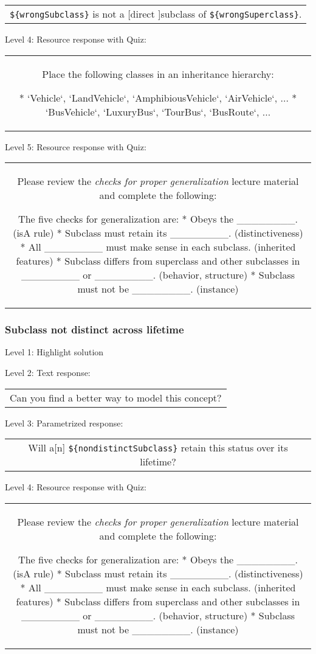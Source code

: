 \begin{tabular}{|c}
\verb|${wrongSubclass}| is not a [direct ]subclass of \verb|${wrongSuperclass}|.
\end{tabular} \medskip

\noindent Level 4: Resource response with Quiz:

\begin{tabular}{|c}
Place the following classes in an inheritance hierarchy:

* `Vehicle`, `LandVehicle`, `AmphibiousVehicle`, `AirVehicle`, ...
* `BusVehicle`, `LuxuryBus`, `TourBus`, `BusRoute`, ...
\end{tabular} \medskip

\noindent Level 5: Resource response with Quiz:

\begin{tabular}{|c}
Please review the \textit{checks for proper generalization} lecture material
and complete the following:

The five checks for generalization are:
* Obeys the ________. (isA rule)
* Subclass must retain its ________. (distinctiveness)
* All ________ must make sense in each subclass. (inherited features)
* Subclass differs from superclass and other subclasses in ________ or ________. 
(behavior, structure)
* Subclass must not be ________. (instance)
\end{tabular} \medskip


\subsubsection{Subclass not distinct across lifetime}

\noindent Level 1: Highlight solution \medskip

\noindent Level 2: Text response: \medskip

\begin{tabular}{|c}
Can you find a better way to model this concept?
\end{tabular} \medskip

\noindent Level 3: Parametrized response: \medskip

\begin{tabular}{|c}
Will a[n] \verb|${nondistinctSubclass}| retain this status over its lifetime?
\end{tabular} \medskip

\noindent Level 4: Resource response with Quiz:

\begin{tabular}{|c}
Please review the \textit{checks for proper generalization} lecture material
and complete the following:

The five checks for generalization are:
* Obeys the ________. (isA rule)
* Subclass must retain its ________. (distinctiveness)
* All ________ must make sense in each subclass. (inherited features)
* Subclass differs from superclass and other subclasses in ________ or ________. 
(behavior, structure)
* Subclass must not be ________. (instance)
\end{tabular} \medskip


